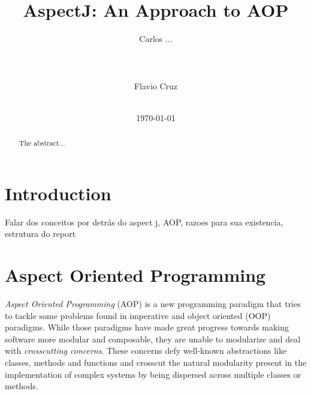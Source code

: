 \documentclass{template}
\begin{document}
\title{AspectJ: An Approach to AOP}


\author{
\alignauthor
Carlos ...\\
       \\
       \\
       \\
\alignauthor
Flavio Cruz\\
       \\
}
\date{\today}

\maketitle
\begin{abstract}
The abstract...
\end{abstract}


\section{Introduction}
Falar dos conceitos por detrás do aspect j, AOP, razoes para sua existencia, estrutura do report

\section{Aspect Oriented Programming}

\emph{Aspect Oriented Programming} (AOP) is a new programming paradigm that tries to tackle some problems
found in imperative and object oriented (OOP) paradigms. While those paradigms have made great progress towards
making software more modular and composable, they are unable to modularize and deal with \emph{crosscutting concerns}.
These concerns defy well-known abstractions like classes, methods and functions and crosscut the
natural modularity present in the implementation of complex systems by being dispersed
across multiple classes or methods. \cite{Kiczales01anoverview}
\end{document}

